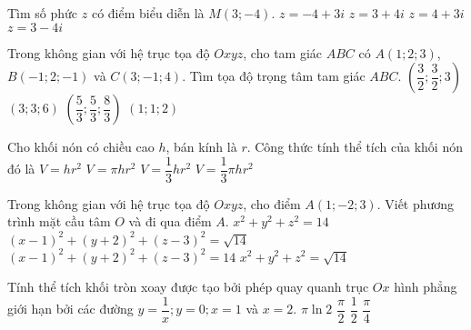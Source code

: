 	\begin{ex}%
		Tìm số phức $z$ có điểm biểu diễn là $M(3;-4)$.		
		\choice
		{$z=-4+3i$}
		{$z=3+4i$}
		{$z=4+3i$}
		{\True $z=3-4i$}
	\end{ex}
	\begin{ex}%
		Trong không gian với hệ trục tọa độ $Oxyz$, cho tam giác $ABC$ có $A(1;2;3)$,$B(-1;2;-1)$ và $C(3;-1;4)$. Tìm tọa độ trọng tâm tam giác $ABC$.		
		\choice
		{$\left(\dfrac{3}{2};\dfrac{3}{2};3\right)$}
		{$(3;3;6)$}
		{$\left(\dfrac{5}{3};\dfrac{5}{3};\dfrac{8}{3}\right)$}
		{\True $(1;1;2)$}
	\end{ex}
	\begin{ex}%
		Cho khối nón có chiều cao $h$, bán kính là $r$. Công thức tính thể tích của khối nón đó là	
		\choice
		{$V=h r^2$}
		{$V=\pi hr^2$}
		{$V=\dfrac{1}{3}hr^2$}
		{\True $V=\dfrac{1}{3} \pi hr^2$}
	\end{ex}
	\begin{ex}%
		Trong không gian với hệ trục tọa độ $Oxyz$, cho điểm $A(1;-2;3)$. Viết phương trình mặt  cầu tâm $O$ và đi qua điểm $A$.	
		\choice
		{$x^2+y^2+z^2=14$}
		{$(x-1)^2+(y+2)^2+(z-3)^2=\sqrt{14}$}
		{$(x-1)^2+(y+2)^2+(z-3)^2=14$}
		{\True $x^2+y^2+z^2=\sqrt{14}$}
	\end{ex}
	\begin{ex}%
		Tính thể tích khối tròn xoay được tạo bởi phép quay quanh trục $Ox$ hình phẳng giới hạn bởi các đường $y=\dfrac{1}{x};y=0;x=1$ và $x=2$.		
		\choice
		{$\pi \ln 2$}
		{\True $\dfrac{\pi}{2}$}
		{$\dfrac{1}{2}$}
		{$\dfrac{\pi}{4}$}
	\end{ex}

